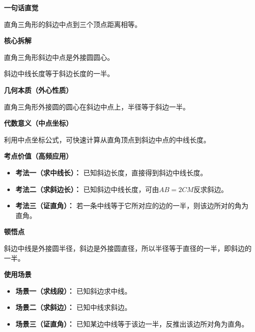 \begin{explanationbox}
	\textbf{\textcolor{CExplanation}{一句话直觉}}

	直角三角形的斜边中点到三个顶点距离相等。

	\medskip
	\textbf{\textcolor{CExplanation}{核心拆解}}
	\begin{description}[style=nextline, leftmargin=2.8em, labelsep=0.5em, itemsep=0.45em]
		\item[\textbf{要点一（外心等价）：}] 直角三角形斜边中点是外接圆圆心。
		\item[\textbf{要点二（数值关系）：}] 斜边中线长度等于斜边长度的一半。
	\end{description}

	\medskip
	\textbf{\textcolor{CExplanation}{几何本质（外心性质）}}

	直角三角形外接圆的圆心在斜边中点上，半径等于斜边一半。

	\medskip
	\textbf{\textcolor{CExplanation}{代数意义（中点坐标）}}

	利用中点坐标公式，可快速计算从直角顶点到斜边中点的中线长度。

	\medskip
	\textbf{\textcolor{CExplanation}{考点价值（高频应用）}}
	\begin{itemize}[leftmargin=*, itemsep=0.5em, topsep=0.4em]
		\item \textbf{考法一（求中线长）：} 已知斜边长度，直接得到斜边中线长度。
		\item \textbf{考法二（求斜边长）：} 已知斜边中线长度，可由$AB=2CM$反求斜边。
		\item \textbf{考法三（证直角）：} 若一条中线等于它所对应的边的一半，则该边所对的角为直角。
	\end{itemize}

	\medskip
	\textbf{\textcolor{CExplanation}{顿悟点}}

	斜边中线是外接圆半径，斜边是外接圆直径，所以半径等于直径的一半，即斜边的一半。

	\medskip
	\textbf{\textcolor{CExplanation}{使用场景}}
	\begin{itemize}[leftmargin=*, itemsep=0.5em, topsep=0.4em]
		\item \textbf{场景一（求线段）：} 已知斜边求中线。
		\item \textbf{场景二（求斜边）：} 已知中线求斜边。
		\item \textbf{场景三（证直角）：} 已知某边中线等于该边一半，反推出该边所对角为直角。
	\end{itemize}
\end{explanationbox}